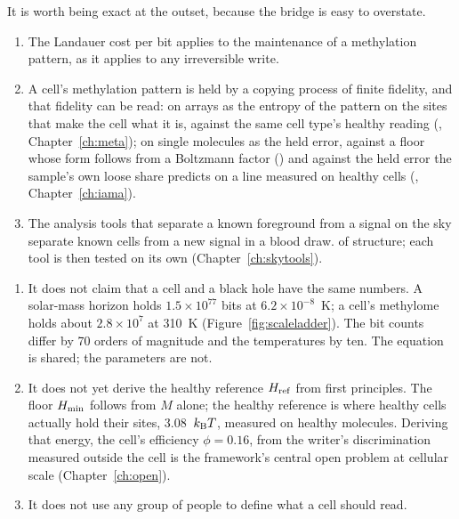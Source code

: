 It is worth being exact at the outset, because the bridge is easy to overstate.

\begin{keybox}[title=What the bridge claims]
\begin{enumerate}
\item The Landauer cost per bit applies to the maintenance of a methylation pattern, as it applies
      to any irreversible write. \derived
\item A cell's methylation pattern is held by a copying process of finite fidelity, and that fidelity can be read: on
      arrays as the entropy of the pattern on the sites that make the cell what it is, against the same cell type's healthy
      reading (\calibrated, Chapter~\ref{ch:meta}); on single molecules as the held error, against a floor whose form follows from a Boltzmann factor (\derived) and against the held error the sample's own loose share predicts on a line measured on healthy cells (\measured, Chapter~\ref{ch:iama}).
\item The analysis tools that separate a known foreground from a signal on the sky separate known
      cells from a new signal in a blood draw. \analogy{} of structure; each tool is then tested on
      its own (Chapter~\ref{ch:skytools}).
\end{enumerate}
\end{keybox}

\begin{keybox}[title=What the bridge does not claim]
\begin{enumerate}
\item It does not claim that a cell and a black hole have the same numbers. A solar-mass horizon
      holds $1.5\times10^{77}$ bits at $6.2\times10^{-8}$~K; a cell's methylome holds about
      $2.8\times10^7$ at 310~K (Figure~\ref{fig:scaleladder}). The bit counts differ by 70 orders
      of magnitude and the temperatures by ten. The equation is shared; the parameters are not.
\item It does not yet derive the healthy reference $H_{\rm ref}$ from first principles. The floor $H_{\min}$ follows from $M$ alone; the healthy
      reference is where healthy cells actually hold their sites, 3.08~$k_{\mathrm B} T$, measured on healthy molecules. Deriving that energy, the
      cell's efficiency $\phi=0.16$, from the writer's discrimination measured outside the cell is the framework's central open problem at cellular scale (Chapter~\ref{ch:open}).
\item It does not use any group of people to define what a cell should read.
\end{enumerate}
\end{keybox}

